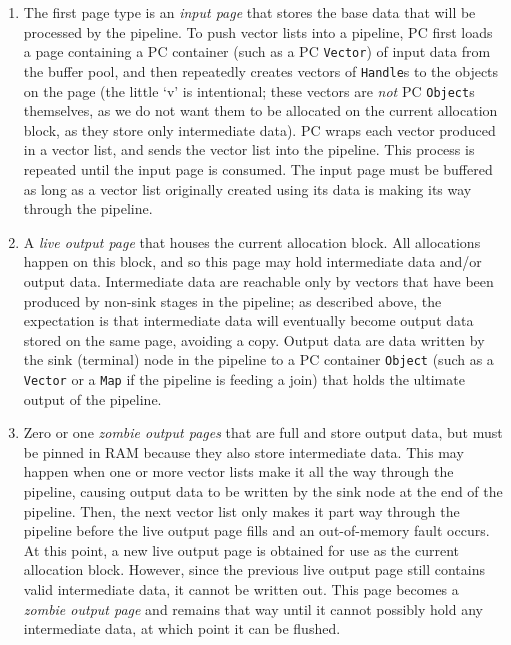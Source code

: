 \begin{enumerate}

\item The first page type is an \emph{input page} that stores the base data that will be processed by the pipeline.
To push vector lists into a pipeline, PC first loads a page containing a PC container (such as a PC \texttt{Vector}) of 
input data from the buffer pool, and then repeatedly creates vectors of \texttt{Handle}s to the objects on
the page (the little `v' is intentional; these vectors are \emph{not} PC \texttt{Object}s themselves, as we do not want them to be allocated
on the current  allocation block, as they store only intermediate data).  PC wraps
each vector produced in a vector list, and sends the vector list into the pipeline.  This process is repeated until the input page is consumed.
The input page must be buffered as long as a vector list originally created using its data is making its way through the pipeline.  

\item A \emph{live output page} that houses the current allocation block.  All allocations happen on this block, and so this page may hold intermediate data
and/or output data.
Intermediate data are 
reachable only by vectors that have been produced
by non-sink stages in the pipeline; as described above, the expectation is that intermediate data will eventually become output data stored on the
same page, avoiding a copy.  Output data are
data written by the sink (terminal) node in the pipeline to a PC container 
\texttt{Object} (such as a \texttt{Vector} or a \texttt{Map} if the pipeline is feeding a join) that holds the ultimate output
of the pipeline.

\item Zero or one \emph{zombie output pages} that are full and store output data, but must
be pinned in RAM because they also store intermediate data.  This may happen when one or more vector lists make it all the way through the pipeline,
causing output data to be written by 
the sink node at the end of the pipeline.  Then, the next vector list only makes it part way through the pipeline before the live
output page
fills and an out-of-memory fault occurs.  
At this point, a new live output page is obtained for use
as the current allocation block.  However, since the previous live output page still contains valid intermediate data, it cannot be written out.  This 
page becomes a \emph{zombie output page} and remains that way until it cannot possibly hold any intermediate data, at which point it can be flushed.


\end{enumerate}

